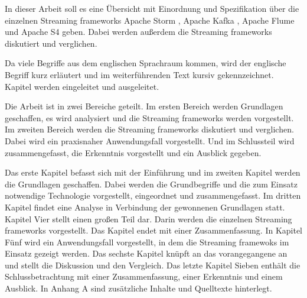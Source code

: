 In dieser Arbeit soll es eine Übersicht mit Einordnung und Spezifikation über die einzelnen Streaming frameworks Apache Storm , Apache Kafka , Apache Flume  und Apache S4  geben. Dabei werden außerdem die Streaming frameworks diskutiert und verglichen. 

Da viele Begriffe aus dem englischen Sprachraum kommen, wird der englische Begriff kurz erläutert und im weiterführenden Text kursiv gekennzeichnet. Kapitel werden eingeleitet und ausgeleitet.

Die Arbeit ist in zwei Bereiche geteilt. Im ersten Bereich werden Grundlagen geschaffen, es wird analysiert und die Streaming frameworks werden vorgestellt. 
Im zweiten Bereich werden die Streaming frameworks diskutiert und verglichen. Dabei wird ein praxisnaher Anwendungsfall vorgestellt. Und im Schlussteil wird zusammengefasst, die Erkenntnis vorgestellt und ein Ausblick gegeben.

Das erste Kapitel befasst sich mit der Einführung und im zweiten Kapitel werden die Grundlagen geschaffen. Dabei werden die Grundbegriffe und die zum Einsatz notwendige Technologie vorgestellt, eingeordnet und zusammengefasst. Im dritten Kapitel findet eine Analyse in Verbindung der gewonnenen Grundlagen statt. Kapitel Vier stellt einen großen Teil dar. Darin werden die einzelnen Streaming frameworks vorgestellt. Das Kapitel endet mit einer Zusammenfassung. In Kapitel Fünf wird ein Anwendungsfall vorgestellt, in dem die Streaming framewoks im Einsatz gezeigt werden. Das sechste Kapitel knüpft an das vorangegangene an und stellt die Diskussion und den Vergleich. Das letzte Kapitel Sieben enthält die Schlussbetrachtung mit einer Zusammenfassung, einer Erkenntnis und einem Ausblick. In Anhang A sind zusätzliche Inhalte und Quelltexte hinterlegt.